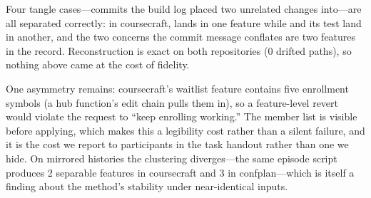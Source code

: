 Four tangle cases---commits the build log placed two unrelated changes into---are
all separated correctly: in coursecraft,  lands in
one feature while  and its test land in another, and
the two concerns the commit message conflates are two features in the record.
Reconstruction is exact on both repositories (0 drifted paths), so nothing
above came at the cost of fidelity.

One asymmetry remains: coursecraft's waitlist feature contains five enrollment
symbols (a hub function's edit chain pulls them in), so a feature-level revert
would violate the request to ``keep enrolling working.'' The member list is
visible before applying, which makes this a legibility cost rather than a silent
failure, and it is the cost we report to participants in the task handout
rather than one we hide. On mirrored histories the clustering diverges---the same
episode script produces 2 separable features in coursecraft and 3 in
confplan---which is itself a finding about the method's stability under
near-identical inputs.
